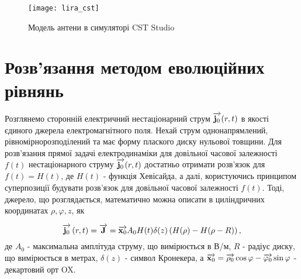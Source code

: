 \begin{figure}[htbp] \begin{center}
\texttt{[image: lira\_cst]}
\caption{Модель антени в симуляторі CST Studio} \label{fig:lira_cst}
\end{center} \end{figure}

\section{Розв'язання методом еволюційних рівнянь} \label{sec:tranc_resp}

Розглянемо сторонній електричний нестаціонарний струм $ \overrightarrow{\mathbf j_0} (r,t) $ 
в якості єдиного джерела електромагнітного поля. Нехай струм 
однонапрямлений, рівномірнорозподілений та має форму плаского диску 
нульової товщини. Для розв'язання прямої задачі електродинаміки для 
довільної часової залежності $ f(t) $ нестаціонарного струму 
$ \overrightarrow{\mathbf j_0} (r,t) $ достатньо отримати розв'язок для  $ f(t) = H(t) $, 
де $ H(t) $ - функція Хевісайда, а далі, користуючись принципом суперпозиції
будувати розв'язок для довільної часової залежності $ f(t) $.
Тоді, джерело, що розглядається, математично можна описати в циліндричних 
координатах $ \rho, \varphi, z $, як

\begin{equation}
\overrightarrow{\mathbf j_0} \left( r, t \right) = \overrightarrow{\mathbf J} = \overrightarrow{\mathbf x_0} A_0 H(t) \delta(z) 
\left(  H(\rho) - H(\rho - R) \right),
\end{equation}
%
де $ A_0 $ - максимальна амплітуда струму, що вимірюється в В/м, $ R $ - 
радіус диску, що вимірюється в метрах, $ \delta(z) $ - символ Кронекера, а 
$ \overrightarrow{\mathbf x_0} = \overrightarrow{\mathbf \rho_0} \cos \varphi - \overrightarrow{\mathbf \varphi_0} \sin \varphi $ 
- декартовий орт OX.


